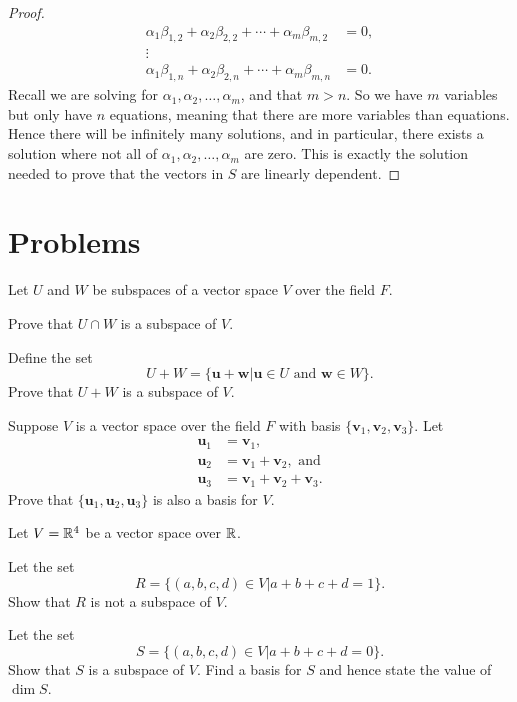 \begin{proof}
\begin{align*}
        \alpha_1\beta_{1,2} + \alpha_2\beta_{2,2} + \cdots + \alpha_m\beta_{m,2} &= 0,\\
        \vdots\\
        \alpha_1\beta_{1,n} + \alpha_2\beta_{2,n} + \cdots + \alpha_m\beta_{m,n} &= 0.
    \end{align*}
    Recall we are solving for $\alpha_1, \alpha_2, \dots, \alpha_m$, and that $m > n$. So we have $m$ variables but only have $n$ equations, meaning that there are more variables than equations. Hence there will be infinitely many solutions, and in particular, there exists a solution where not all of $\alpha_1, \alpha_2, \dots, \alpha_m$ are zero. This is exactly the solution needed to prove that the vectors in $S$ are linearly dependent.
\end{proof}

\newpage

\section{Problems}
\begin{problem}
    Let $U$ and $W$ be subspaces of a vector space $V$ over the field $F$.
    \begin{partquestions}{\alph*}
        \item Prove that $U \cap W$ is a subspace of $V$.
        \item Define the set
        \[
            U + W = \{\mathbf{u} + \mathbf{w} \vert \mathbf{u} \in U \text{ and } \mathbf{w} \in W\}.
        \]
        Prove that $U + W$ is a subspace of $V$.
    \end{partquestions}
\end{problem}

\begin{problem}
    Suppose $V$ is a vector space over the field $F$ with basis $\{\mathbf{v}_1, \mathbf{v}_2, \mathbf{v}_3\}$. Let
    \begin{align*}
        \mathbf{u}_1 &= \mathbf{v}_1,\\
        \mathbf{u}_2 &= \mathbf{v}_1 + \mathbf{v}_2, \text{ and}\\
        \mathbf{u}_3 &= \mathbf{v}_1 + \mathbf{v}_2 + \mathbf{v}_3.
    \end{align*}
    Prove that $\{\mathbf{u}_1, \mathbf{u}_2, \mathbf{u}_3\}$ is also a basis for $V$.
\end{problem}

\begin{problem}
    Let $V = \mathbb{R}^4$ be a vector space over $\mathbb{R}$.
    \begin{partquestions}{\alph*}
        \item Let the set
        \[
            R = \{(a, b, c, d) \in V \vert a + b + c + d = 1\}.
        \]
        Show that $R$ is not a subspace of $V$.

        \item Let the set
        \[
            S = \{(a, b, c, d) \in V \vert a + b + c + d = 0\}.
        \]
        Show that $S$ is a subspace of $V$. Find a basis for $S$ and hence state the value of $\dim{S}$.
    \end{partquestions}
\end{problem}

